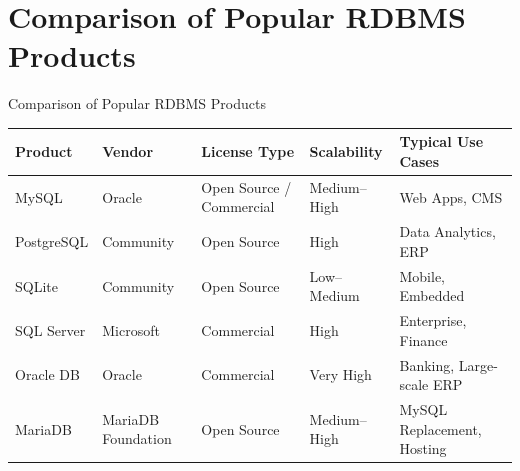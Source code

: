 \documentclass[aspectratio=169, table]{beamer}
\begin{document}
\section{Comparison of Popular RDBMS Products}
\begin{frame}{Comparison of Popular RDBMS Products}
\vspace{20pt}

\renewcommand{\arraystretch}{1.3}
{\footnotesize
\arrayrulewidth=0.7pt
\setlength{\tabcolsep}{3pt}
\begin{tabular}{|p{}|p{}|p{}|p{}|p{}|}
	\hline
	\textbf{Product} & \textbf{Vendor} & \textbf{License Type} & \textbf{Scalability} & \textbf{Typical Use Cases} \\ \hline
	MySQL      & Oracle              & Open Source / Commercial & Medium–High & Web Apps, CMS \\ \hline
	PostgreSQL & Community           & Open Source              & High        & Data Analytics, ERP \\ \hline
	SQLite     & Community           & Open Source              & Low–Medium  & Mobile, Embedded \\ \hline
	SQL Server & Microsoft           & Commercial               & High        & Enterprise, Finance \\ \hline
	Oracle DB  & Oracle              & Commercial               & Very High   & Banking, Large-scale ERP \\ \hline
	MariaDB    & MariaDB Foundation  & Open Source              & Medium–High & MySQL Replacement, Hosting \\ \hline
\end{tabular}
}
\end{frame}
\end{document}
